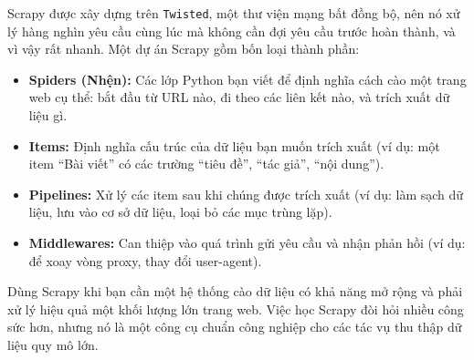 Scrapy được xây dựng trên \texttt{Twisted}, một thư viện mạng bất đồng bộ, nên nó xử lý hàng nghìn yêu cầu cùng lúc mà không cần đợi yêu cầu trước hoàn thành, và vì vậy rất nhanh. Một dự án Scrapy gồm bốn loại thành phần:
\begin{itemize}
    \item \textbf{Spiders (Nhện):} Các lớp Python bạn viết để định nghĩa cách cào một trang web cụ thể: bắt đầu từ URL nào, đi theo các liên kết nào, và trích xuất dữ liệu gì.
    \item \textbf{Items:} Định nghĩa cấu trúc của dữ liệu bạn muốn trích xuất (ví dụ: một item “Bài viết” có các trường “tiêu đề”, “tác giả”, “nội dung”).
    \item \textbf{Pipelines:} Xử lý các item sau khi chúng được trích xuất (ví dụ: làm sạch dữ liệu, lưu vào cơ sở dữ liệu, loại bỏ các mục trùng lặp).
    \item \textbf{Middlewares:} Can thiệp vào quá trình gửi yêu cầu và nhận phản hồi (ví dụ: để xoay vòng proxy, thay đổi user-agent).
\end{itemize}

Dùng Scrapy khi bạn cần một hệ thống cào dữ liệu có khả năng mở rộng và phải xử lý hiệu quả một khối lượng lớn trang web.
Việc học Scrapy đòi hỏi nhiều công sức hơn, nhưng nó là một công cụ chuẩn công nghiệp cho các tác vụ thu thập dữ liệu quy mô lớn.
